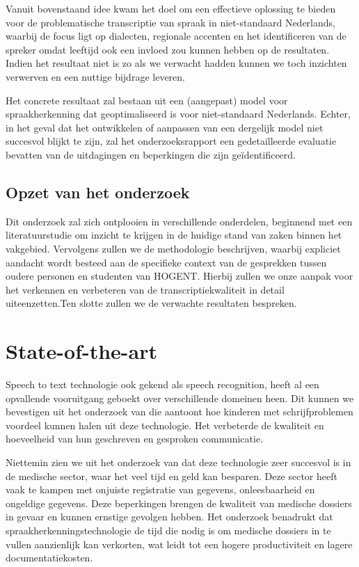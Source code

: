Vanuit bovenstaand idee kwam het doel om een effectieve oplossing te bieden voor de problematische transcriptie van spraak in niet-standaard Nederlands, waarbij de focus ligt op dialecten, regionale accenten en het identificeren van de spreker omdat leeftijd ook een invloed zou kunnen hebben op de resultaten. Indien het resultaat niet is zo als we verwacht hadden kunnen we toch inzichten verwerven en een nuttige bijdrage leveren.

Het concrete resultaat zal bestaan uit een (aangepast) model voor spraakherkenning dat geoptimaliseerd is voor niet-standaard Nederlands. Echter, in het geval dat het ontwikkelen of aanpassen van een dergelijk model niet succesvol blijkt te zijn, zal het onderzoeksrapport een gedetailleerde evaluatie bevatten van de uitdagingen en beperkingen die zijn geïdentificeerd.

\subsection{Opzet van het onderzoek}
Dit onderzoek zal zich ontplooien in verschillende onderdelen, beginnend met een literatuurstudie om inzicht te krijgen in de huidige stand van zaken binnen het vakgebied.   Vervolgens zullen we de methodologie beschrijven, waarbij expliciet aandacht wordt besteed aan de specifieke context van de gesprekken tussen oudere personen en studenten van HOGENT. Hierbij zullen we onze aanpak voor het verkennen en verbeteren van de transcriptiekwaliteit in detail uiteenzetten.Ten slotte zullen we de verwachte resultaten bespreken.




\section{State-of-the-art}%
\label{sec:state-of-the-art}

Speech to text technologie ook gekend als speech recognition, heeft al een opvallende vooruitgang geboekt over verschillende domeinen heen. Dit kunnen we bevestigen uit het onderzoek van \autocite{Kambouri2023} die aantoont hoe kinderen met schrijfproblemen voordeel kunnen halen uit deze technologie. Het verbeterde de kwaliteit en hoeveelheid van hun geschreven en gesproken communicatie.

Niettemin zien we uit het onderzoek van \autocite{ajami2016use} dat deze technologie zeer succesvol is in de medische sector, waar het veel tijd en geld kan besparen. Deze sector heeft vaak te kampen met onjuiste registratie van gegevens, onleesbaarheid en ongeldige gegevens. Deze beperkingen brengen de kwaliteit van medische dossiers in gevaar en kunnen ernstige gevolgen hebben. Het onderzoek benadrukt dat spraakherkenningstechnologie de tijd die nodig is om medische dossiers in te vullen aanzienlijk kan verkorten, wat leidt tot een hogere productiviteit en lagere documentatiekosten.

